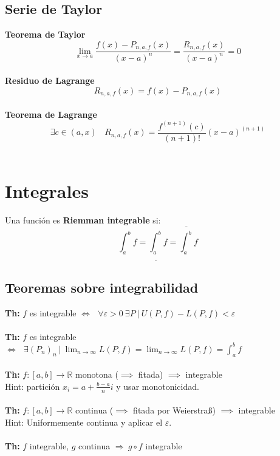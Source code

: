 \documentclass[12pt]{article}
\theoremstyle{plain}
\theoremstyle{definition}
\theoremstyle{remark}
\begin{document}
	\subsection{Serie de Taylor}
	\textbf{Teorema de Taylor}\\
	\[\lim_{x\to a}\frac{f(x)-P_{n, a, f}(x)}{(x-a)^n} = \frac{R_{n, a, f}(x)}{(x-a)^n} = 0\]
	\\
	\textbf{Residuo de Lagrange}\\
	\[R_{n,a,f}(x) = f(x) - P_{n,a,f}(x)\]
	\\
	\textbf{Teorema de Lagrange}\\
	\[\exists c \in (a,x) \ \ \ \ R_{n,a,f}(x) = \frac{f^{(n+1)}(c)}{(n+1)!}(x-a)^{(n+1)}\]
	\\
	
	
	
\section{Integrales}
Una función es \textbf{Riemman integrable} si:
\[\int_a^b{f}= \underline{\int_a^b}f=\overline{\int_a^b}f\]
	
	\subsection{Teoremas sobre integrabilidad}
	\textbf{Th:}
	$f$ es integrable  $\iff \ \ \ \forall \varepsilon > 0 \ \exists P \ | \ U(P,f)-L(P,f)<\varepsilon$ \\
	\\
	\textbf{Th:}
	$f$ es integrable  $\iff \ \ \ \exists (P_n)_n \ | \ \lim_{n\to \infty} L(P,f)=\lim_{n\to \infty} L(P,f)=\int_a^bf$ \\
	\\
	\textbf{Th:}
	$f:[a,b]\to \mathbb{R}$ monotona ($\implies$ fitada) $\implies$ integrable\\
	Hint: partición $x_i=a+\frac{b-a}{n}i$ y usar monotonicidad.\\
	\\
	\textbf{Th:}
	$f:[a,b]\to \mathbb{R}$ continua ($\implies$ fitada por Weierstraß) $\implies$ integrable\\
	Hint: Uniformemente continua y aplicar el $\varepsilon$.\\
	\\
	\textbf{Th:}
	$f$ integrable, $g$ continua $\Rightarrow \ g\circ f$ integrable\\
	\\
\end{document}
